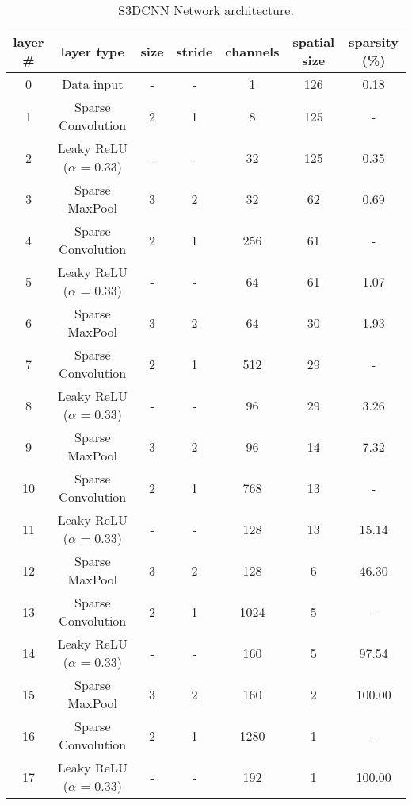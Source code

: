 \begin{table}
\centering{}
\begin{tabular}{|c|c|c|c|c|c|c|}
\hline
layer \#  & layer type & size  & stride & channels & spatial size & sparsity (\%)\footnotemark \tabularnewline
\hline
0 & Data input & - & - & 1 & 126 & 0.18 \tabularnewline
1 & Sparse Convolution & 2 & 1 & 8 & 125 & - \tabularnewline
2 & Leaky ReLU ($\alpha$ = 0.33) & - & - & 32 & 125 & 0.35 \tabularnewline
3 & Sparse MaxPool & 3 & 2 & 32 & 62 & 0.69 \tabularnewline
4 & Sparse Convolution & 2 & 1 & 256 & 61 & - \tabularnewline
5 & Leaky ReLU ($\alpha$ = 0.33) & - & - & 64 & 61 & 1.07 \tabularnewline
6 & Sparse MaxPool & 3 & 2 & 64 & 30 & 1.93 \tabularnewline
7 & Sparse Convolution & 2 & 1 & 512 & 29 & - \tabularnewline
8 & Leaky ReLU ($\alpha$ = 0.33) & - & - & 96 & 29 & 3.26 \tabularnewline
9 & Sparse MaxPool & 3 & 2 & 96 & 14 & 7.32 \tabularnewline
10 & Sparse Convolution & 2 & 1 & 768 & 13 & - \tabularnewline
11 & Leaky ReLU ($\alpha$ = 0.33) & - & - & 128 & 13 & 15.14 \tabularnewline
12 & Sparse MaxPool & 3 & 2 & 128 & 6 & 46.30 \tabularnewline
13 & Sparse Convolution & 2 & 1 & 1024 & 5 & - \tabularnewline
14 & Leaky ReLU ($\alpha$ = 0.33) & - & - & 160 & 5 & 97.54 \tabularnewline
15 & Sparse MaxPool & 3 & 2 & 160 & 2 & 100.00 \tabularnewline
16 & Sparse Convolution & 2 & 1 & 1280 & 1 & - \tabularnewline
17 & Leaky ReLU ($\alpha$ = 0.33) & - & - & 192 & 1 & 100.00 \tabularnewline
\hline
\end{tabular}
\caption{S3DCNN Network architecture.}
\label{tab:net-architecture}
\end{table}

